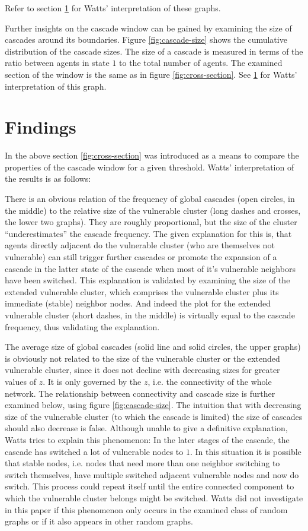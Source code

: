 \documentclass{sig-alternate-05-2015}
\begin{document}
Refer to section \ref{sec:findings} for Watts' interpretation of these graphs.

Further insights on the cascade window can be gained by examining the size of cascades around its boundaries. Figure \ref{fig:cascade-size} shows the cumulative distribution of the cascade sizes. The size of a cascade is measured in terms of the ratio between agents in state $1$ to the total number of agents. The examined section of the window is the same as in figure \ref{fig:cross-section}. See \ref{sec:findings} for Watts' interpretation of this graph.


\section{Findings}\label{sec:findings}

In the above section \ref{fig:cross-section} was introduced as a means to compare the properties of the cascade window for a given threshold. Watts' interpretation of the results is as follows:

There is an obvious relation of the frequency of global cascades (open circles, in the middle) to the relative size of the vulnerable cluster (long dashes and crosses, the lower two graphs). They are roughly proportional, but the size of the cluster ``underestimates'' the cascade frequency. The given explanation for this is, that agents directly adjacent do the vulnerable cluster (who are themselves not vulnerable) can still trigger further cascades or promote the expansion of a cascade in the latter state of the cascade when most of it's vulnerable neighbors have been switched. This explanation is validated by examining the size of the extended vulnerable cluster, which comprises the vulnerable cluster plus its immediate (stable) neighbor nodes. And indeed the plot for the extended vulnerable cluster (short dashes, in the middle) is virtually equal to the cascade frequency, thus validating the explanation.

The average size of global cascades (solid line and solid circles, the upper graphs) is obviously not related to the size of the vulnerable cluster or the extended vulnerable cluster, since it does not decline with decreasing sizes for greater values of $z$. It is only governed by the $z$, i.e. the connectivity of the whole network. The relationship between connectivity and cascade size is further examined below, using figure \ref{fig:cascade-size}. The intuition that with decreasing size of the vulnerable cluster (to which the cascade is limited) the size of cascades should also decrease is false. Although unable to give a definitive explanation, Watts tries to explain this phenomenon: In the later stages of the cascade, the cascade has switched a lot of vulnerable nodes to $1$. In this situation it is possible that stable nodes, i.e. nodes that need more than one neighbor switching to switch themselves, have multiple switched adjacent vulnerable nodes and now do switch. This process could repeat itself until the entire connected component to which the vulnerable cluster belongs might be switched. Watts did not investigate in this paper if this phenomenon only occurs in the examined class of random graphs or if it also appears in other random graphs.
\end{document}

